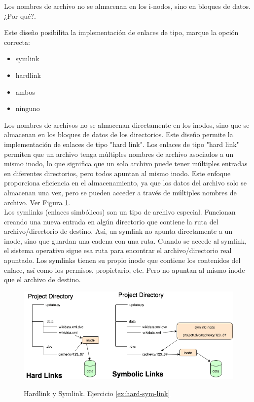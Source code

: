 \documentclass[../main.tex]{subfiles}
\begin{document}
    \begin{exercise}
        Los nombres de archivo no se almacenan en los i-nodos, sino en bloques de datos. ¿Por qué?.

        Este diseño posibilita la implementación de enlaces de tipo, marque la opción correcta:
        \begin{itemize}
            \item symlink
            \item hardlink  \checkmark
            \item ambos
            \item ninguno  
        \end{itemize}

        \begin{answer}
            Los nombres de archivos no se almacenan directamente en los inodos, sino que se almacenan en los bloques de datos de los directorios. Este diseño permite la implementación de enlaces de tipo "hard link". Los enlaces de tipo "hard link" permiten que un archivo tenga múltiples nombres de archivo asociados a un mismo inodo, lo que significa que un solo archivo puede tener múltiples entradas en diferentes directorios, pero todos apuntan al mismo inodo. Este enfoque proporciona eficiencia en el almacenamiento, ya que los datos del archivo solo se almacenan una vez, pero se pueden acceder a través de múltiples nombres de archivo. Ver Figura \ref{fig:hard-sym-link}.\\

            Los symlinks (enlaces simbólicos) son un tipo de archivo especial. Funcionan creando una nueva entrada en algún directorio que contiene la ruta del archivo/directorio de destino.
            Así, un symlink no apunta directamente a un inode, sino que guardan una cadena con una ruta. Cuando se accede al symlink, el sistema operativo sigue esa ruta para encontrar el archivo/directorio real apuntado.
            Los symlinks tienen su propio inode que contiene los contenidos del enlace, así como los permisos, propietario, etc. Pero no apuntan al mismo inode que el archivo de destino.
        \end{answer}
        \label{ex:hard-sym-link}
    \end{exercise}

    \begin{figure}[h]
        \centering
        \includegraphics[scale=0.45]{../images/hard-sym-link.png}
        \label{fig:hard-sym-link}
        \caption{Hardlink y Symlink. Ejercicio \ref{ex:hard-sym-link}}
    \end{figure}
\end{document}
